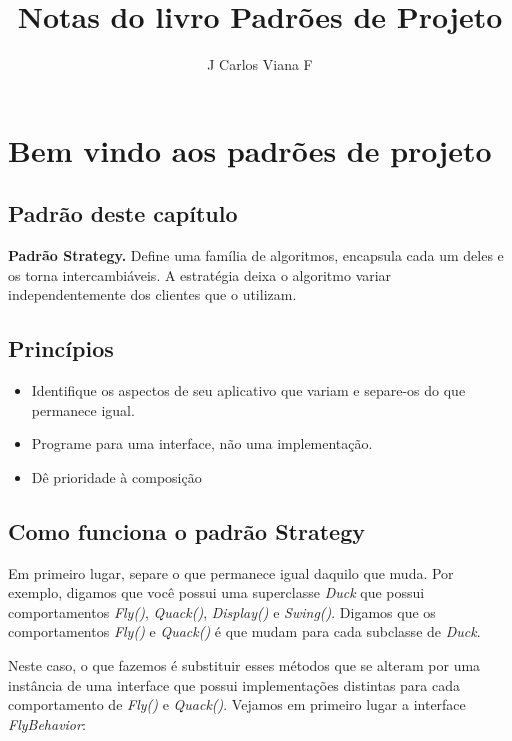 \documentclass[a4paper,11pt]{report}
\title{Notas do livro Padrões de Projeto}
\author{J Carlos Viana F}
\date{}
\begin{document}
\maketitle

\tableofcontents

\chapter{Bem vindo aos padrões de projeto}
\label{chap:bemvindo}

\section{Padrão deste capítulo}

\textbf{Padrão Strategy.} Define uma família de algoritmos, encapsula cada um deles e os torna intercambiáveis. A estratégia deixa o algoritmo variar independentemente dos clientes que o utilizam.

\section{Princípios}

\begin{itemize}
\item Identifique os aspectos de seu aplicativo que variam e separe-os do que permanece igual.
\item Programe para uma interface, não uma implementação.
\item Dê prioridade à composição
\end{itemize}

\section{Como funciona o padrão Strategy}

Em primeiro lugar, separe o que permanece igual daquilo que muda. Por exemplo, digamos que você possui uma superclasse \textit{Duck} que possui comportamentos \textit{Fly()}, \textit{Quack()}, \textit{Display()} e \textit{Swing()}. Digamos que os comportamentos \textit{Fly()} e \textit{Quack()} é que mudam para cada subclasse de \textit{Duck}.

Neste caso, o que fazemos é substituir esses métodos que se alteram por uma instância de uma interface que possui implementações distintas para cada comportamento de \textit{Fly()} e \textit{Quack()}. Vejamos em primeiro lugar a interface \textit{FlyBehavior}:
\end{document}

